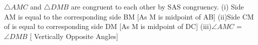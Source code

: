 
$\triangle AMC$ and $\triangle DMB$ are congruent to each other by SAS congruency.
\newline
(i) Side AM  is equal to the corresponding side BM  [As M is midpoint of AB]
\newline
(ii)Side CM of is equal to corresponding side DM [As M is midpoint of DC]
\newline
(iii)$\angle AMC$ = $\angle DMB$ [ Vertically Opposite Angles]